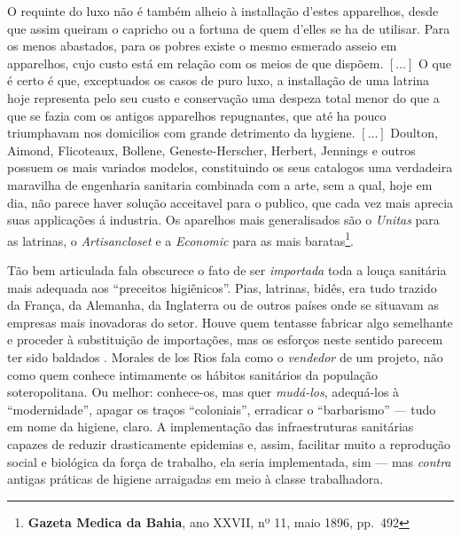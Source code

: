 \begin{citacao}
O requinte do luxo não é também alheio à installação d'estes apparelhos, desde que assim queiram o capricho ou a fortuna de quem d'elles se ha de utilisar. Para os menos abastados, para os pobres existe o mesmo esmerado asseio em apparelhos, cujo custo está em relação com os meios de que dispõem. \([\dots]\) O que é certo é que, exceptuados os casos de puro luxo, a installação de uma latrina hoje representa pelo seu custo e conservação uma despeza total menor do que a que se fazia com os antigos apparelhos repugnantes, que até ha pouco triumphavam nos domicilios com grande detrimento da hygiene. \([\dots]\) Doulton, Aimond, Flicoteaux, Bollene, Geneste-Herscher, Herbert, Jennings e outros possuem os mais variados modelos, constituindo os seus catalogos uma verdadeira maravilha de engenharia sanitaria combinada com a arte, sem a qual, hoje em dia, não parece haver solução acceitavel para o publico, que cada vez mais aprecia suas applicações á industria. Os aparelhos mais generalisados são o \textit{Unitas} para as latrinas, o \textit{Artisancloset} e a \textit{Economic} para as mais baratas\footnote{\textbf{Gazeta Medica da Bahia}, ano XXVII, nº 11, maio 1896, pp.~492}.
\end{citacao}

Tão bem articulada fala obscurece o fato de ser \textit{importada} toda a louça sanitária mais adequada aos ``preceitos higiênicos''. Pias, latrinas, bidês, era tudo trazido da França, da Alemanha, da Inglaterra ou de outros países onde se situavam as empresas mais inovadoras do setor. Houve quem tentasse fabricar algo semelhante e proceder à substituição de importações, mas os esforços neste sentido parecem ter sido baldados \cite{paulillo_corcasacid_2017}. Morales de los Rios fala como o \textit{vendedor} de um projeto, não como quem conhece intimamente os hábitos sanitários da população soteropolitana. Ou melhor: conhece-os, mas quer \textit{mudá-los}, adequá-los à ``modernidade'', apagar os traços ``coloniais'', erradicar o ``barbarismo'' --- tudo em nome da higiene, claro. A implementação das infraestruturas sanitárias capazes de reduzir drasticamente epidemias e, assim, facilitar muito a reprodução social e biológica da força de trabalho, ela seria implementada, sim --- mas \textit{contra} antigas práticas de higiene arraigadas em meio à classe trabalhadora.

